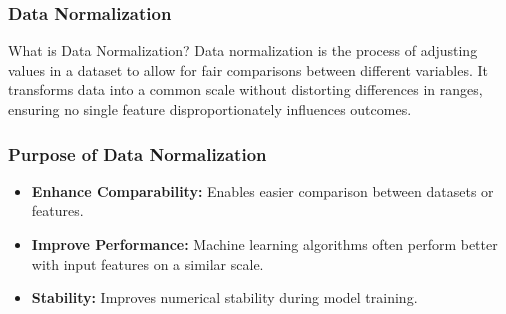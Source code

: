\documentclass[aspectratio=169]{beamer}
\begin{document}
\begin{frame}[fragile]
    \frametitle{Data Normalization}
    \begin{block}{What is Data Normalization?}
        Data normalization is the process of adjusting values in a dataset to allow for fair comparisons between different variables. 
        It transforms data into a common scale without distorting differences in ranges, ensuring no single feature disproportionately influences outcomes.
    \end{block}
\end{frame}

\begin{frame}[fragile]
    \frametitle{Purpose of Data Normalization}
    \begin{itemize}
        \item \textbf{Enhance Comparability:} Enables easier comparison between datasets or features.
        \item \textbf{Improve Performance:} Machine learning algorithms often perform better with input features on a similar scale.
        \item \textbf{Stability:} Improves numerical stability during model training.
    \end{itemize}
\end{frame}
\end{document}
